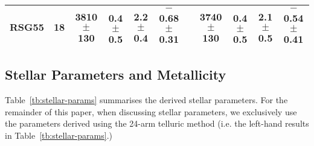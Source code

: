 \documentclass[iop]{emulateapj}
\def\pp{$\phantom{-}$}
\def\o{$\phantom{0}$}
\begin{document}
\begin{table*}
\begin{center}
\begin{tabular}{lc cccc c cccc}
RSG55 & 18& 3810 $\pm$ 130  & \pp0.4 $\pm$ 0.5 & 2.2 $\pm$ 0.4 & $-$0.68 $\pm$ 0.31 & & 3740 $\pm$ 130  & \pp0.4 $\pm$ 0.5 &  2.1 $\pm$ 0.5 & $-$0.54 $\pm$ 0.41 \\

  \hline
  \end{tabular}
  \end{center}
\end{table*}

\subsection{Stellar Parameters and Metallicity} %
\label{sub:stellar_parameters_and_metallicity}

Table~\ref{tb:stellar-params} summarises the derived stellar parameters.
For the remainder of this paper, when discussing stellar parameters,
we exclusively use the parameters derived using the 24-arm telluric method (i.e. the left-hand results in Table~\ref{tb:stellar-params}.)
\end{document}
